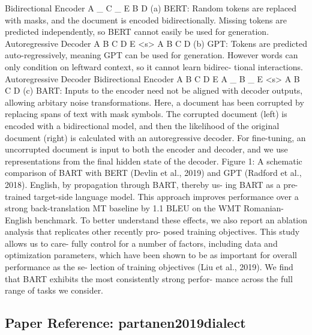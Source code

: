 Bidirectional Encoder A _ C _ E B D (a) BERT: Random tokens are replaced with masks, and the document is encoded bidirectionally. Missing tokens are predicted independently, so BERT cannot easily be used for generation. Autoregressive Decoder A B C D E <s> A B C D (b) GPT: Tokens are predicted auto-regressively, meaning GPT can be used for generation. However words can only condition on leftward context, so it cannot learn bidirec- tional interactions. Autoregressive Decoder Bidirectional Encoder A B C D E A _ B _ E <s> A B C D (c) BART: Inputs to the encoder need not be aligned with decoder outputs, allowing arbitary noise transformations. Here, a document has been corrupted by replacing spans of text with mask symbols. The corrupted document (left) is encoded with a bidirectional model, and then the likelihood of the original document (right) is calculated with an autoregressive decoder. For ﬁne-tuning, an uncorrupted document is input to both the encoder and decoder, and we use representations from the ﬁnal hidden state of the decoder. Figure 1: A schematic comparison of BART with BERT (Devlin et al., 2019) and GPT (Radford et al., 2018). English, by propagation through BART, thereby us- ing BART as a pre-trained target-side language model. This approach improves performance over a strong back-translation MT baseline by 1.1 BLEU on the WMT Romanian-English benchmark. To better understand these effects, we also report an ablation analysis that replicates other recently pro- posed training objectives. This study allows us to care- fully control for a number of factors, including data and optimization parameters, which have been shown to be as important for overall performance as the se- lection of training objectives (Liu et al., 2019). We ﬁnd that BART exhibits the most consistently strong perfor- mance across the full range of tasks we consider.

\vspace{18pt}


\subsection*{Paper Reference: partanen2019dialect}

